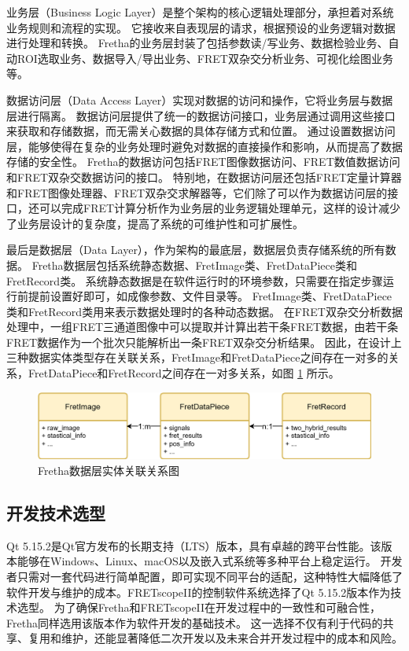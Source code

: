 业务层（Business Logic Layer）是整个架构的核心逻辑处理部分，承担着对系统业务规则和流程的实现。
它接收来自表现层的请求，根据预设的业务逻辑对数据进行处理和转换。
Fretha的业务层封装了包括参数读/写业务、数据检验业务、自动ROI选取业务、数据导入/导出业务、FRET双杂交分析业务、可视化绘图业务等。

数据访问层（Data Access Layer）实现对数据的访问和操作，它将业务层与数据层进行隔离。
数据访问层提供了统一的数据访问接口，业务层通过调用这些接口来获取和存储数据，而无需关心数据的具体存储方式和位置。
通过设置数据访问层，能够使得在复杂的业务处理时避免对数据的直接操作和影响，从而提高了数据存储的安全性。
Fretha的数据访问包括FRET图像数据访问、FRET数值数据访问和FRET双杂交数据访问的接口。
特别地，在数据访问层还包括FRET定量计算器和FRET图像处理器、FRET双杂交求解器等，它们除了可以作为数据访问层的接口，还可以完成FRET计算分析作为业务层的业务逻辑处理单元，这样的设计减少了业务层设计的复杂度，提高了系统的可维护性和可扩展性。

最后是数据层（Data Layer），作为架构的最底层，数据层负责存储系统的所有数据。
Fretha数据层包括系统静态数据、FretImage类、FretDataPiece类和FretRecord类。
系统静态数据是在软件运行时的环境参数，只需要在指定步骤运行前提前设置好即可，如成像参数、文件目录等。
FretImage类、FretDataPiece类和FretRecord类用来表示数据处理时的各种动态数据。
在FRET双杂交分析数据处理中，一组FRET三通道图像中可以提取并计算出若干条FRET数据，由若干条FRET数据作为一个批次只能解析出一条FRET双杂交分析结果。
因此，在设计上三种数据实体类型存在关联关系，FretImage和FretDataPiece之间存在一对多的关系，FretDataPiece和FretRecord之间存在一对多关系，如图 \ref{fig:fretha_data_relations} 所示。

\begin{figure}[hbtp]
    \centering
    \includegraphics[width=1\linewidth]{../figures/2/2_Fretha数据层对应关系.png}
    \caption{Fretha数据层实体关联关系图}
    \label{fig:fretha_data_relations}
\end{figure}

\subsection{开发技术选型}
\ifshowtext
Qt 5.15.2是Qt官方发布的长期支持（LTS）版本，具有卓越的跨平台性能。该版本能够在Windows、Linux、macOS以及嵌入式系统等多种平台上稳定运行。
开发者只需对一套代码进行简单配置，即可实现不同平台的适配，这种特性大幅降低了软件开发与维护的成本。FRETscopeII的控制软件系统选择了Qt 5.15.2版本作为技术选型。
为了确保Fretha和FRETscopeII在开发过程中的一致性和可融合性，Fretha同样选用该版本作为软件开发的基础技术。
这一选择不仅有利于代码的共享、复用和维护，还能显著降低二次开发以及未来合并开发过程中的成本和风险。

